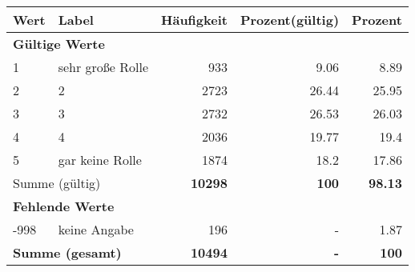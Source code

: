      \begin{longtable}{lXrrr}
     \toprule
     \textbf{Wert} & \textbf{Label} & \textbf{Häufigkeit} & \textbf{Prozent(gültig)} & \textbf{Prozent} \\
     \endhead
     \midrule
     \multicolumn{5}{l}{\textbf{Gültige Werte}}\\

     1 &
     \multicolumn{1}{X}{ sehr große Rolle   } &


       \num{933} &
       \num[round-mode=places,round-precision=2]{9,06} &
         \num[round-mode=places,round-precision=2]{8,89} \\

     2 &
     \multicolumn{1}{X}{ 2   } &


       \num{2723} &
       \num[round-mode=places,round-precision=2]{26,44} &
         \num[round-mode=places,round-precision=2]{25,95} \\

     3 &
     \multicolumn{1}{X}{ 3   } &


       \num{2732} &
       \num[round-mode=places,round-precision=2]{26,53} &
         \num[round-mode=places,round-precision=2]{26,03} \\

     4 &
     \multicolumn{1}{X}{ 4   } &


       \num{2036} &
       \num[round-mode=places,round-precision=2]{19,77} &
         \num[round-mode=places,round-precision=2]{19,4} \\

     5 &
     \multicolumn{1}{X}{ gar keine Rolle   } &


       \num{1874} &
       \num[round-mode=places,round-precision=2]{18,2} &
         \num[round-mode=places,round-precision=2]{17,86} \\
     \midrule
     \multicolumn{2}{l}{Summe (gültig)} &
       \textbf{\num{10298}} &
     \textbf{100} &
       \textbf{\num[round-mode=places,round-precision=2]{98,13}} \\
     \multicolumn{5}{l}{\textbf{Fehlende Werte}}\\
       -998 &
       keine Angabe &
         \num{196} &
        - &
         \num[round-mode=places,round-precision=2]{1,87} \\
     \midrule
     \multicolumn{2}{l}{\textbf{Summe (gesamt)}} &
          \textbf{\num{10494}} &
        \textbf{-} &
        \textbf{100} \\
     \bottomrule
     \end{longtable}
     
